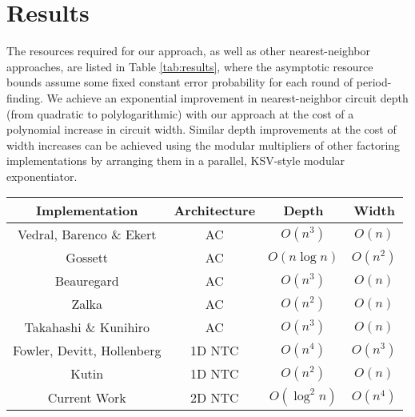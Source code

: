 \section{Results}
\label{sec:results}

The resources required for our approach,
as well as other nearest-neighbor approaches,
are listed in Table \ref{tab:results},
where the asymptotic resource bounds assume some fixed constant error
probability for each round of period-finding.
We achieve an exponential
improvement in nearest-neighbor circuit depth (from quadratic to polylogarithmic)
with our approach at the cost of a polynomial increase in
circuit width. Similar depth improvements at the cost of width increases can be achieved using the modular multipliers
of other factoring implementations
by arranging them in a parallel, KSV-style modular exponentiator.
%
\begin{table*}[htb!]
\begin{center}
\begin{tabular}{|c|c|c|c|}
\hline
Implementation             & Architecture      & Depth             & Width     \\
\hline
Vedral, Barenco \& Ekert \cite{Vedral1996}   & \textsc{AC}       & $O(n^3)$      & $O(n)$ \\
Gossett \cite{Gossett1998}                   & \textsc{AC}       & $O(n \log n)$ & $O(n^2)$  \\
Beauregard \cite{Beauregard2002}                & \textsc{AC}       & $O(n^3)$      & $O(n)$ \\
Zalka \cite{Zalka1998}                     & \textsc{AC}       & $O(n^2)$      & $O(n)$     \\
Takahashi \& Kunihiro \cite{Takahashi2006}     & \textsc{AC}       & $O(n^3)$      & $O(n)$ \\
\hline
Fowler, Devitt, Hollenberg \cite{Fowler2004} & \textsc{1D NTC}   & $O(n^4)$ & $O(n^3)$\\
Kutin \cite{Kutin2006}                     & \textsc{1D NTC}   & $O(n^2)$ & $O(n)$\\
\hline
Current Work               & \textsc{2D NTC}   & $O(\log^2{n})$ & $O(n^4)$   \\
\hline
\end{tabular}
\end{center}
\caption{Asymptotic resource usage for quantum factoring of an $n$-bit number.}
\label{tab:results}
\end{table*}
